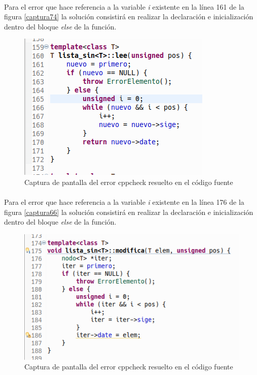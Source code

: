 			\paragraph{}Para el error que hace referencia a la variable \textit{i} existente en la línea 161 de la figura \ref*{captura74} la solución consistirá en realizar la declaración e inicialización dentro del bloque \textit{else} de la función.
			
			\begin{figure}[H]
				\centering
				\includegraphics[scale=0.7]{img/captura75.png}
				\caption{Captura de pantalla del error cppcheck  resuelto en el código fuente}
				\label{captura75}
			\end{figure}
		
			\paragraph{}Para el error que hace referencia a la variable \textit{i} existente en la línea 176 de la figura \ref*{captura66} la solución consistirá en realizar la declaración e inicialización dentro del bloque \textit{else} de la función.
			
			\begin{figure}[H]
				\centering
				\includegraphics[scale=0.7]{img/captura76.png}
				\caption{Captura de pantalla del error cppcheck  resuelto en el código fuente}
				\label{captura76}
			\end{figure}
		
